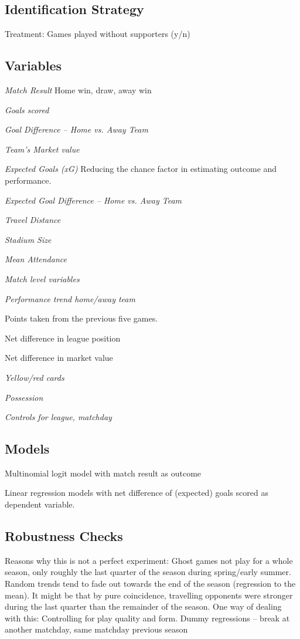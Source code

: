 \documentclass[Afour,sageh,times]{sagej}
\begin{document}
\subsection{Identification Strategy}
Treatment: Games played without supporters (y/n)

\subsection{Variables}

\textit{Match Result}
Home win, draw, away win

\textit{Goals scored}

\textit{Goal Difference – Home vs. Away Team}

\textit{Team’s Market value}

\textit{Expected Goals (xG)}
Reducing the chance factor in estimating outcome and performance.

\textit{Expected Goal Difference – Home vs. Away Team}

\textit{Travel Distance}

\textit{Stadium Size}

\textit{Mean Attendance}

\textit{Match level variables}

\textit{Performance trend home/away team}

Points taken from the previous five games.

Net difference in league position

Net difference in market value

\textit{Yellow/red cards}

\textit{Possession}

\textit{Controls for league, matchday}


\subsection{Models}

Multinomial logit model with match result as outcome

Linear regression models with net difference of (expected) goals scored as dependent variable.


\subsection{Robustness Checks}
Reasons why this is not a perfect experiment:
Ghost games not play for a whole season, only roughly the last quarter of the season during spring/early summer.
Random trends tend to fade out towards the end of the season (regression to the mean).
It might be that by pure coincidence, travelling opponents were stronger during the last quarter than the remainder of the season.
One way of dealing with this: Controlling for play quality and form.
Dummy regressions – break at another matchday, same matchday previous season
\end{document}
